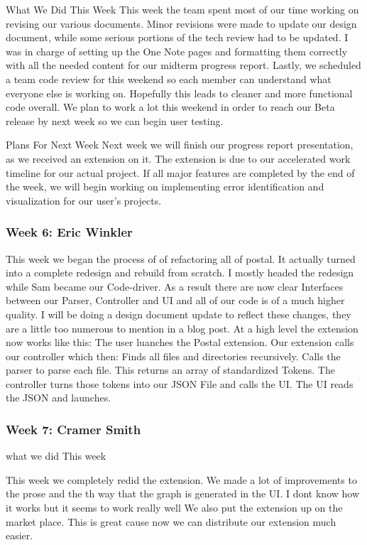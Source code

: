 What We Did This Week
This week the team spent most of our time working on revising our various documents. Minor revisions were made to update our design document, while some serious portions of the tech review had to be updated. I was in charge of setting up the One Note pages and formatting them correctly with all the needed content for our midterm progress report. Lastly, we scheduled a team code review for this weekend so each member can understand what everyone else is working on. Hopefully this leads to cleaner and more functional code overall. We plan to work a lot this weekend in order to reach our Beta release by next week so we can begin user testing.

Plans For Next Week
Next week we will finish our progress report presentation, as we received an extension on it. The extension is due to our accelerated work timeline for our actual project. If all major features are completed by the end of the week, we will begin working on implementing error identification and visualization for our user's projects.

\subsubsection{Week 6: Eric Winkler}

This week we began the process of of refactoring all of postal. It actually turned into a complete redesign and rebuild from scratch. I mostly headed the redesign while Sam became our Code-driver. As a result there are now clear Interfaces between our Parser, Controller and UI and all of our code is of a much higher quality. I will be doing a design document update to reflect these changes, they are a little too numerous to mention in a blog post. At a high level the extension now works like this:
The user luanches the Postal extension.
Our extension calls our controller which then:
   Finds all files and directories recursively.
   Calls the parser to parse each file. This returns an array of standardized Tokens.
   The controller turns those tokens into our JSON File and calls the UI.
   The UI reads the JSON and launches.


\subsubsection{Week 7: Cramer Smith}

what we did This week 

This week we completely redid the extension. We made a lot of improvements to the prose and the th way that the graph is generated in the UI. I dont know how it works but it seems to work really well
We also put the extension up on the market place. This is great cause now we can distribute our extension much easier.


